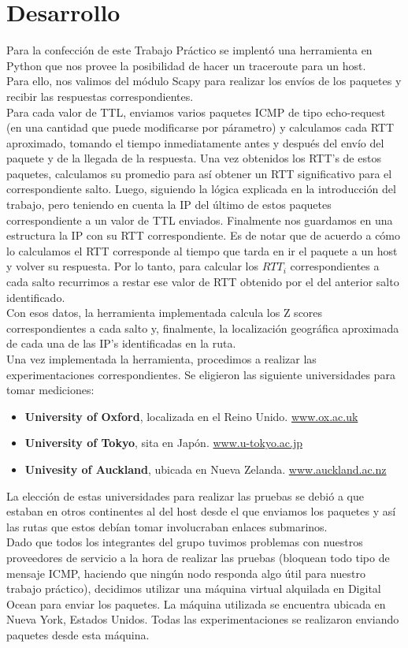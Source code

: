 \section{Desarrollo}

\indent \indent Para la confección de este Trabajo Práctico se implentó una herramienta en Python que nos provee la posibilidad de hacer un traceroute para un host. \\
\indent Para ello, nos valimos del módulo Scapy para realizar los envíos de los paquetes y recibir las respuestas correspondientes.\\
\indent Para cada valor de TTL, enviamos varios paquetes ICMP de tipo echo-request (en una cantidad que puede modificarse por párametro) y calculamos cada RTT aproximado, tomando el tiempo inmediatamente antes y después del envío del paquete y de la llegada de la respuesta. Una vez obtenidos los RTT's de estos paquetes, calculamos su promedio para así obtener un RTT significativo para el correspondiente salto. Luego, siguiendo la lógica explicada en la introducción del trabajo, pero teniendo en cuenta la IP del último de estos paquetes correspondiente a un valor de TTL enviados. Finalmente nos guardamos en una estructura la IP con su RTT correspondiente. Es de notar que de acuerdo a cómo lo calculamos el RTT corresponde al tiempo que tarda en ir el paquete a un host y volver su respuesta. Por lo tanto, para calcular los $RTT_i$ correspondientes a cada salto recurrimos a restar ese valor de RTT obtenido por el del anterior salto identificado.\\
\indent Con esos datos, la herramienta implementada calcula los Z scores correspondientes a cada salto y, finalmente, la localización geográfica aproximada de cada una de las IP's identificadas en la ruta.\\
\indent Una vez implementada la herramienta, procedimos a realizar las experimentaciones correspondientes. Se eligieron las siguiente universidades para tomar mediciones:\\
\begin{itemize}
\item \textbf{University of Oxford}, localizada en el Reino Unido. \url{www.ox.ac.uk}
\item \textbf{University of Tokyo}, sita en Japón. \url{www.u-tokyo.ac.jp}
\item \textbf{Univesity of Auckland}, ubicada en Nueva Zelanda. \url{www.auckland.ac.nz}
\end{itemize}

\indent La elección de estas universidades para realizar las pruebas se debió a que estaban en otros continentes al del host desde el que enviamos los paquetes y así las rutas que estos debían tomar involucraban enlaces submarinos.\\
\indent Dado que todos los integrantes del grupo tuvimos problemas con nuestros proveedores de servicio a la hora de realizar las pruebas (bloquean todo tipo de mensaje ICMP, haciendo que ningún nodo responda algo útil para nuestro trabajo práctico), decidimos utilizar una máquina virtual alquilada en Digital Ocean para enviar los paquetes. La máquina utilizada se encuentra ubicada en Nueva York, Estados Unidos. Todas las experimentaciones se realizaron enviando paquetes desde esta máquina.\\
